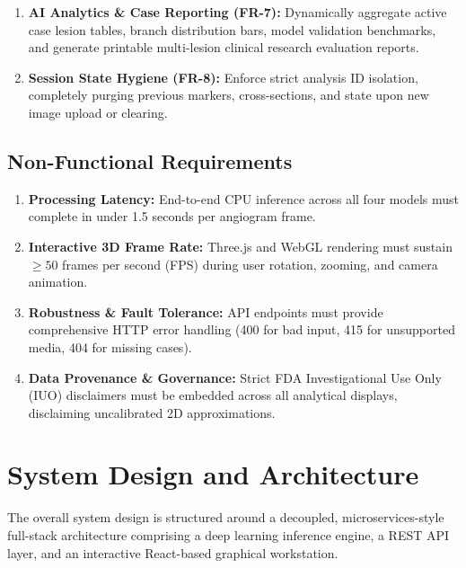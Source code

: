 \begin{enumerate}
    \item \textbf{AI Analytics \& Case Reporting (FR-7):} Dynamically aggregate active case lesion tables, branch distribution bars, model validation benchmarks, and generate printable multi-lesion clinical research evaluation reports.
    \item \textbf{Session State Hygiene (FR-8):} Enforce strict analysis ID isolation, completely purging previous markers, cross-sections, and state upon new image upload or clearing.
\end{enumerate}

\subsection{Non-Functional Requirements}
\begin{enumerate}
    \item \textbf{Processing Latency:} End-to-end CPU inference across all four models must complete in under 1.5 seconds per angiogram frame.
    \item \textbf{Interactive 3D Frame Rate:} Three.js and WebGL rendering must sustain $\ge 50$ frames per second (FPS) during user rotation, zooming, and camera animation.
    \item \textbf{Robustness \& Fault Tolerance:} API endpoints must provide comprehensive HTTP error handling (400 for bad input, 415 for unsupported media, 404 for missing cases).
    \item \textbf{Data Provenance \& Governance:} Strict FDA Investigational Use Only (IUO) disclaimers must be embedded across all analytical displays, disclaiming uncalibrated 2D approximations.
\end{enumerate}

\section{System Design and Architecture}
The overall system design is structured around a decoupled, microservices-style full-stack architecture comprising a deep learning inference engine, a REST API layer, and an interactive React-based graphical workstation.


